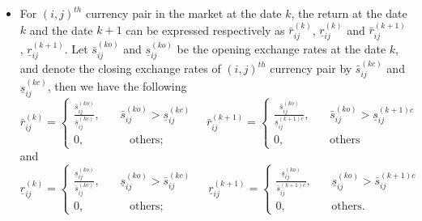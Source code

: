 \documentclass[11pt]{article}
\numberwithin{equation}{section}
\begin{document}
\begin{itemize}
	\item For ${(i,j)}^{th}$ currency pair in the market at the date $k$, the return at the  date $k$ and the date $k+1$ can be expressed respectively as $\bar r_{ij}^{(k)}$, $\underline r_{ij}^{(k)}$ and 
	$\bar r_{ij}^{(k+1)}$, $\underline r_{ij}^{(k+1)}$. Let $\bar s_{ij}^{(ko)}$ and $\underline s_{ij}^{(ko)}$ be the opening exchange rates at the date $k$, and denote  the closing exchange rates 
	of ${(i,j)}^{th}$ currency pair by $\bar s_{ij}^{(kc)}$ and $\underline s_{ij}^{(kc)}$, then we have the following 
	\begin{equation}\label{r1}
     \bar r_{ij}^{(k)}=
     \begin{cases}
\frac{\bar s_{ij}^{(ko)}}{\underline s_{ij}^{(kc)}} , ~~~~~~~~\bar s_{ij}^{(ko)}>\underline s_{ij}^{(kc)}\\
0 , ~~~~~~~~~~~~~~~~~~\mbox{others}; 
\end{cases}  \quad      
     \bar r_{ij}^{(k+1)}=
     \begin{cases}
\frac{\bar s_{ij}^{(ko)}}{\underline s_{ij}^{(k+1)c}} , ~~~~~~~~\bar s_{ij}^{(ko)}>\underline s_{ij}^{(k+1)c}\\
0 , ~~~~~~~~~~~~~~~~~~\mbox{others}
\end{cases} 
    \end{equation}
    and
	\begin{equation}\label{r2}
     \underline r_{ij}^{(k)}=
      \begin{cases}
\frac{\underline s_{ij}^{(ko)}}{\bar s_{ij}^{(kc)}} , ~~~~~~~~\underline s_{ij}^{(ko)}>\bar s_{ij}^{(kc)}\,\\ 
0 , ~~~~~~~~~~~~~~~~~~\mbox{others};
\end{cases} \quad      
     \underline r_{ij}^{(k+1)}=
     \begin{cases}
\frac{\underline s_{ij}^{(ko)}}{\bar s_{ij}^{(k+1)c}} , ~~~~~~~~\underline s_{ij}^{(ko)}>\bar s_{ij}^{(k+1)c}\\
0 , ~~~~~~~~~~~~~~~~~~\mbox{others}. 
\end{cases}     
    \end{equation}
    

\end{itemize}
\end{document}
